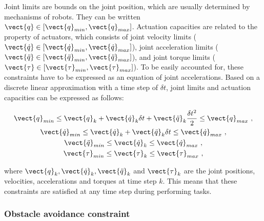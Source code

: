 Joint limits are bounds on the joint position, which are usually determined by mechanisms of robots. They can be written $\vect{q} \in [ \vect{q}_{min}, \vect{q}_{max} ]$. Actuation capacities are related to the property of actuators, which consists of joint velocity limits ($\vect{\dot{q}} \in [ \vect{\dot{q}}_{min}, \vect{\dot{q}}_{max} ]$), joint acceleration limits ($\vect{\ddot{q}} \in [ \vect{\ddot{q}}_{min}, \vect{\ddot{q}}_{max} ]$), and joint torque limits ($\vect{\tau} \in [ \vect{\tau}_{min}, \vect{\tau}_{max} ]$). To be easily accounted for, these constraints have to be expressed as an equation of joint accelerations. Based on a discrete linear approximation with a time step of $\delta t$, joint limits and actuation capacities can be expressed as follows:
\begin{singlespace}
\begin{gather}
\vect{q}_{min} \leq \vect{q}_{k}+\vect{\dot{q}}_{k}\delta t+ \vect{\ddot{q}}_{k}\frac{\delta t^2}{2}\leq \vect{q}_{max} ~, \label{eq:limit q} \\
\vect{\dot{q}}_{min} \leq \vect{\dot{q}}_{k}+\vect{\ddot{q}}_{k}\delta t \leq \vect{\dot{q}}_{max} ~, \label{eq:limit dq} \\
\vect{\ddot{q}}_{min} \leq \vect{\dot{q}}_k \leq \vect{\dot{q}}_{max} ~, \label{eq:limit ddq}\\
\vect{\tau}_{min} \leq \vect{\tau}_k \leq \vect{\tau}_{max} ~,\label{eq:limit tau}
\end{gather}
\end{singlespace}
\noindent where $\vect{q}_{k}, \vect{\dot{q}}_{k}, \vect{\ddot{q}}_{k}$ and $\vect{\tau}_k$ are the joint positions, velocities, accelerations and torques at time step $k$. This means that these constraints are satisfied at any time step during performing tasks.  %


\subsubsection{Obstacle avoidance constraint}

